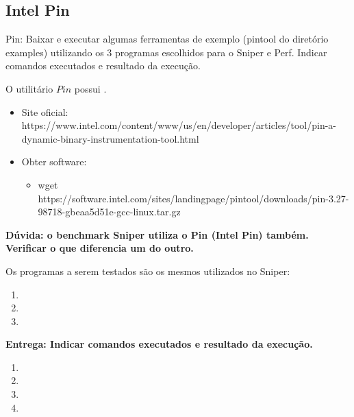 
\subsection{Intel Pin}

Pin: Baixar e executar algumas ferramentas de exemplo (pintool do diretório examples) utilizando os 3 programas escolhidos para o Sniper e Perf. Indicar comandos executados e resultado da execução.

O utilitário $Pin$ possui .

\begin{itemize}
    \item Site oficial: https://www.intel.com/content/www/us/en/developer/articles/tool/pin-a-dynamic-binary-instrumentation-tool.html
    \item Obter software:
    \begin{itemize}
        \item wget https://software.intel.com/sites/landingpage/pintool/downloads/pin-3.27-98718-gbeaa5d51e-gcc-linux.tar.gz
    \end{itemize}
\end{itemize}

\textbf{Dúvida: o benchmark Sniper utiliza o Pin (Intel Pin) também. Verificar o que diferencia um do outro.}

Os programas a serem testados são os mesmos utilizados no Sniper:

\begin{enumerate}
    \item 
    \item 
    \item 
\end{enumerate}


\textbf{Entrega: Indicar comandos executados e resultado da execução.} \\

\begin{enumerate}
    \item  
    \item  
    \item  
    \item  
\end{enumerate}
